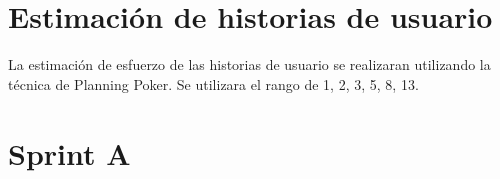 \section{Estimaci\'on de historias de usuario}
La estimación de esfuerzo de las historias de usuario se realizaran utilizando la técnica de Planning Poker. Se utilizara el rango de 1, 2, 3, 5, 8, 13.

\section{Sprint A}


